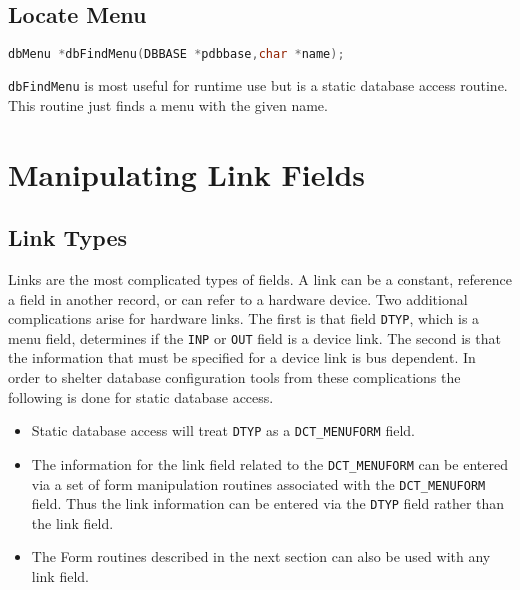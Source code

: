 \subsection{Locate Menu}

\begin{lstlisting}[language=C]
dbMenu *dbFindMenu(DBBASE *pdbbase,char *name);
\end{lstlisting}

\verb|dbFindMenu| is most useful for runtime use but is a static database access routine.
This routine just finds a menu with the given name.

\section{Manipulating Link Fields}

\subsection{Link Types}

Links are the most complicated types of fields.
A link can be a constant, reference a field in another record, or can refer to a hardware device.
Two additional complications arise for hardware links.
The first is that field \verb|DTYP|, which is a menu field, determines if the \verb|INP| or \verb|OUT| field is a device link.
The second is that the information that must be specified for a device link is bus dependent.
In order to shelter database configuration tools from these complications the following is done for static database access.

\begin{itemize}
\item Static database access will treat \verb|DTYP| as a \verb|DCT_MENUFORM| field.

\item The information for the link field related to the \verb|DCT_MENUFORM| can be entered via a set of form manipulation routines associated with the \verb|DCT_MENUFORM| field.
Thus the link information can be entered via the \verb|DTYP| field rather than the link field.

\item The Form routines described in the next section can also be used with any link field.

\end{itemize}

